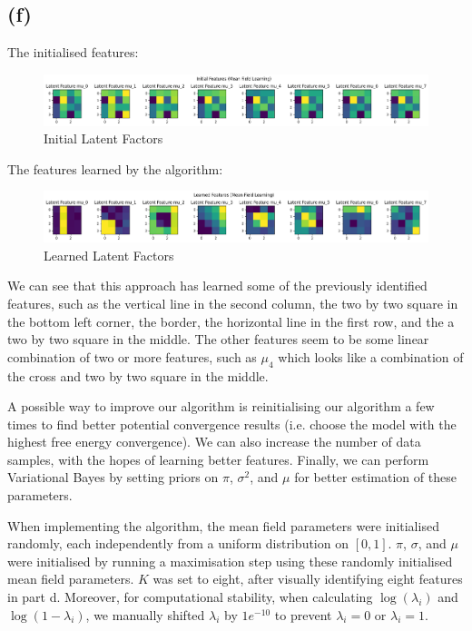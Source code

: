 \documentclass[12pt]{article}
\begin{document}
\subsection*{(f)}

The initialised features:

\begin{figure}[h]
\centering
\includegraphics[scale=0.4]{outputs/q3/f-init-latent-factors}
\caption{Initial Latent Factors}
\label{fig:3f-init-latent-factors}
\end{figure}

The features learned by the algorithm:

\begin{figure}[h]
\centering
\includegraphics[scale=0.4]{outputs/q3/f-latent-factors}
\caption{Learned Latent Factors}
\label{fig:3f-latent-factors}
\end{figure}

We can see that this approach has learned some of the previously identified features, such as the vertical line in the second column, the two by two square in the bottom left corner, the border, the horizontal line in the first row, and the a two by two square in the middle. The other features seem to be some linear combination of two or more features, such as $\mu_4$ which looks like a combination of the cross and two by two square in the middle.

A possible way to improve our algorithm is reinitialising our algorithm a few times to find better potential convergence results (i.e. choose the model with the highest free energy convergence). We can also increase the number of data samples, with the hopes of learning better features. Finally, we can perform Variational Bayes by setting priors on $\pi$, $\sigma^2$, and $\mu$ for better estimation of these parameters.

When implementing the algorithm, the mean field parameters were initialised randomly, each independently from a uniform distribution on $[ 0, 1]$. $\pi$, $\sigma$, and $\mu$ were initialised by running a maximisation step using these randomly initialised mean field parameters. $K$ was set to eight, after visually identifying eight features in part d. Moreover, for computational stability, when calculating $\log(\lambda_i)$ and $\log(1-\lambda_i)$, we manually shifted $\lambda_i$ by $1e^{-10}$ to prevent $\lambda_i=0$ or $\lambda_i = 1$.
\end{document}
